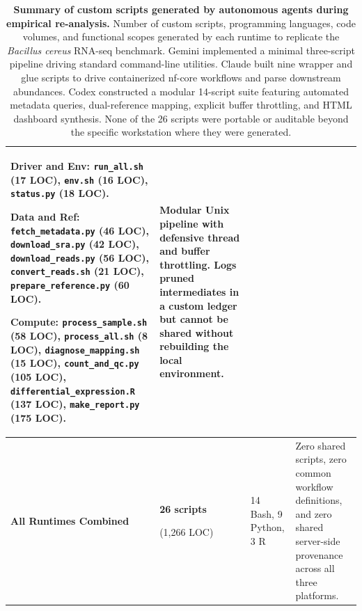 \documentclass[11pt,letterpaper]{article}
\newcommand{\tool}[1]{\textsf{#1}}
\begin{document}
\begin{table}[!htbp]
\begin{tabularx}{\textwidth}{p{2.8cm}p{2.2cm}XX}
\textbf{Driver and Env:} \texttt{run\_all.sh} (17 LOC), \texttt{env.sh} (16 LOC), \texttt{status.py} (18 LOC). \par
\textbf{Data and Ref:} \texttt{fetch\_metadata.py} (46 LOC), \texttt{download\_sra.py} (42 LOC), \texttt{download\_reads.py} (56 LOC), \texttt{convert\_reads.sh} (21 LOC), \texttt{prepare\_reference.py} (60 LOC). \par
\textbf{Compute:} \texttt{process\_sample.sh} (58 LOC), \texttt{process\_all.sh} (8 LOC), \texttt{diagnose\_mapping.sh} (15 LOC), \texttt{count\_and\_qc.py} (105 LOC), \texttt{differential\_expression.R} (137 LOC), \texttt{make\_report.py} (175 LOC). &
Modular Unix pipeline with defensive thread and buffer throttling. Logs pruned intermediates in a custom ledger but cannot be shared without rebuilding the local environment. \\
\midrule
\textbf{All Runtimes Combined} & \textbf{26 scripts} \par (1,266 LOC) & 14 Bash, 9 Python, 3 R & Zero shared scripts, zero common workflow definitions, and zero shared server-side provenance across all three platforms. \\
\bottomrule
\end{tabularx}
\caption{\textbf{Summary of custom scripts generated by autonomous agents during empirical re-analysis.} Number of custom scripts, programming languages, code volumes, and functional scopes generated by each runtime to replicate the \textit{Bacillus cereus} RNA-seq benchmark. Gemini implemented a minimal three-script pipeline driving standard command-line utilities. Claude built nine wrapper and glue scripts to drive containerized \tool{nf-core} workflows and parse downstream abundances. Codex constructed a modular 14-script suite featuring automated metadata queries, dual-reference mapping, explicit buffer throttling, and HTML dashboard synthesis. None of the 26 scripts were portable or auditable beyond the specific workstation where they were generated.}
\label{tab:agent_scripts}
\end{table}

\clearpage
\end{document}
